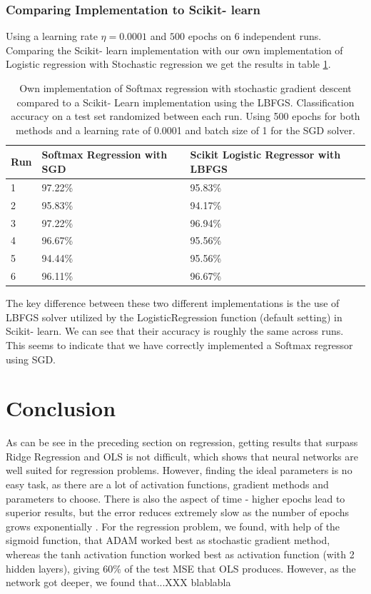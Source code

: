 \documentclass[11pt,a4paper,titlepage]{article}
\begin{document}
\subsubsection{Comparing Implementation to Scikit- learn}
Using a learning rate $\eta = 0.0001$ and $500$ epochs on $6$ independent runs. Comparing the Scikit- learn implementation with our own implementation of Logistic regression with Stochastic regression we get the results in table \ref{Softmax_sci_v_us}.
\begin{table}[H]
\caption[Classification accuracy comparison to Scikit- Learn]{Own implementation of Softmax regression with stochastic gradient descent compared to a Scikit- Learn implementation using the LBFGS. Classification accuracy on a test set randomized between each run. Using 500 epochs for both methods and a learning rate of 0.0001 and batch size of 1 for the SGD solver.}
\centering
\begin{tabular}{|l|l|l|}
\hline
Run & Softmax Regression with SGD & Scikit Logistic Regressor with LBFGS \\ \hline
1   & 97.22\%                     & 95.83\%                              \\ \hline
2   & 95.83\%                     & 94.17\%                              \\ \hline
3   & 97.22\%                     & 96.94\%                              \\ \hline
4   & 96.67\%                     & 95.56\%                              \\ \hline
5   & 94.44\%                     & 95.56\%                              \\ \hline
6   & 96.11\%                     & 96.67\%                              \\ \hline
\end{tabular}\label{Softmax_sci_v_us}
\end{table}
The key difference between these two different implementations is the use of LBFGS solver utilized by the LogisticRegression function (default setting) in Scikit- learn. We can see that their accuracy is roughly the same across runs. This seems to indicate that we have correctly implemented a Softmax regressor using SGD.

\section{Conclusion}
As can be see in the preceding section on regression, getting results that surpass Ridge Regression and OLS is not difficult, which shows that neural networks are well suited for regression problems. However, finding the ideal parameters is no easy task, as there are a lot of activation functions, gradient methods and parameters to choose. There is also the aspect of time - higher epochs lead to superior results, but the error reduces extremely slow as the number of epochs grows exponentially \citep{handsOnMachineLearning}. For the regression problem, we found, with help of the sigmoid function, that ADAM worked best as stochastic gradient method, whereas the tanh activation function worked best as activation function (with 2 hidden layers), giving $60\%$ of the test MSE that OLS produces. However, as the network got deeper, we found that...XXX blablabla
\end{document}
